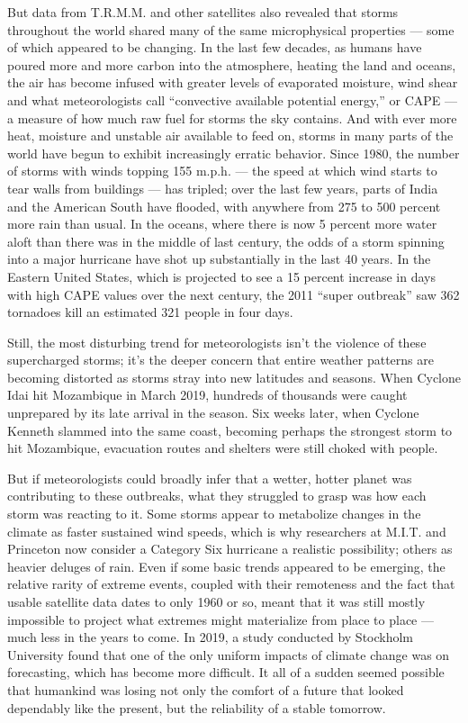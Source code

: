 But data from T.R.M.M. and other satellites also revealed that storms
throughout the world shared many of the same microphysical properties
--- some of which appeared to be changing. In the last few decades, as
humans have poured more and more carbon into the atmosphere, heating the
land and oceans, the air has become infused with greater levels of
evaporated moisture, wind shear and what meteorologists call
``convective available potential energy,'' or CAPE --- a measure of how
much raw fuel for storms the sky contains. And with ever more heat,
moisture and unstable air available to feed on, storms in many parts of
the world have begun to exhibit increasingly erratic behavior. Since
1980, the number of storms with winds topping 155 m.p.h. --- the speed
at which wind starts to tear walls from buildings --- has tripled; over
the last few years, parts of India and the American South have flooded,
with anywhere from 275 to 500 percent more rain than usual. In the
oceans, where there is now 5 percent more water aloft than there was in
the middle of last century, the odds of a storm spinning into a major
hurricane have shot up substantially in the last 40 years. In the
Eastern United States, which is projected to see a 15 percent increase
in days with high CAPE values over the next century, the 2011 ``super
outbreak'' saw 362 tornadoes kill an estimated 321 people in four days.

Still, the most disturbing trend for meteorologists isn't the violence
of these supercharged storms; it's the deeper concern that entire
weather patterns are becoming distorted as storms stray into new
latitudes and seasons. When Cyclone Idai hit Mozambique in March 2019,
hundreds of thousands were caught unprepared by its late arrival in the
season. Six weeks later, when Cyclone Kenneth slammed into the same
coast, becoming perhaps the strongest storm to hit Mozambique,
evacuation routes and shelters were still choked with people.

But if meteorologists could broadly infer that a wetter, hotter planet
was contributing to these outbreaks, what they struggled to grasp was
how each storm was reacting to it. Some storms appear to metabolize
changes in the climate as faster sustained wind speeds, which is why
researchers at M.I.T. and Princeton now consider a Category Six
hurricane a realistic possibility; others as heavier deluges of rain.
Even if some basic trends appeared to be emerging, the relative rarity
of extreme events, coupled with their remoteness and the fact that
usable satellite data dates to only 1960 or so, meant that it was still
mostly impossible to project what extremes might materialize from place
to place --- much less in the years to come. In 2019, a study conducted
by Stockholm University found that one of the only uniform impacts of
climate change was on forecasting, which has become more difficult. It
all of a sudden seemed possible that humankind was losing not only the
comfort of a future that looked dependably like the present, but the
reliability of a stable tomorrow.


